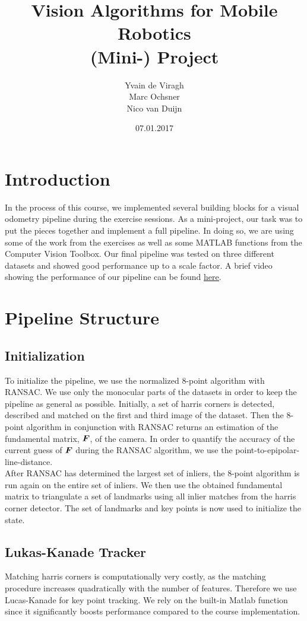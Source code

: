 \documentclass[11pt]{article}
\title{Vision Algorithms for Mobile Robotics\\ (Mini-) Project}
\author{Yvain de Viragh\\Marc Ochsner\\Nico van Duijn}
\date{07.01.2017}
\newcommand{\mat}{\matrixsym}
\begin{document}
\maketitle

\section{Introduction}
In the process of this course, we implemented several building blocks for a visual odometry pipeline during the exercise sessions. As a mini-project, our task was to put the pieces together and implement a full pipeline. In doing so, we are using some of the work from the exercises as well as some MATLAB functions from the Computer Vision Toolbox. Our final pipeline was tested on three different datasets and showed good performance up to a scale factor. A brief video showing the performance of our pipeline can be found \href{https://www.youtube.com/watch?v=7DpAWUQQgVU}{\underline{here}}.


\section{Pipeline Structure}
\subsection{Initialization}
To initialize the pipeline, we use the normalized 8-point algorithm with RANSAC. We use only the monocular parts of the datasets in order to keep the pipeline as general as possible. Initially, a set of harris corners is detected, described and matched on the first and third image of the dataset. Then the 8-point algorithm in conjunction with RANSAC returns an estimation of the fundamental matrix, $\mat{F}$, of the camera. In order to quantify the accuracy of the current guess of $\mat{F}$ during the RANSAC algorithm, we use the point-to-epipolar-line-distance.\\
After RANSAC has determined the largest set of inliers, the 8-point algorithm is run again on the entire set of inliers. We then use the obtained fundamental matrix to triangulate a set of landmarks using all inlier matches from the harris corner detector. The set of landmarks and key points is now used to initialize the state.

\subsection{Lukas-Kanade Tracker}
Matching harris corners is computationally very costly, as the matching procedure increases quadratically with the number of features. Therefore we use Lucas-Kanade for key point tracking. We rely on the built-in Matlab function since it significantly boosts performance compared to the course implementation.
\end{document}
